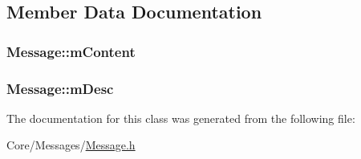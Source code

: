 \subsection{Member Data Documentation}
\subsubsection[{\texorpdfstring{m\+Content}{mContent}}]{ Message\+::m\+Content\hspace{0.3cm}{\ttfamily [private]}}\hypertarget{classMessage_a2186c08dfc88dd436d0df1018f5765e6}{}\label{classMessage_a2186c08dfc88dd436d0df1018f5765e6}
\subsubsection[{\texorpdfstring{m\+Desc}{mDesc}}]{ Message\+::m\+Desc\hspace{0.3cm}{\ttfamily [private]}}\hypertarget{classMessage_af468496867cb091479ca34266e77ffa5}{}\label{classMessage_af468496867cb091479ca34266e77ffa5}


The documentation for this class was generated from the following file\+:\begin{DoxyCompactItemize}
\item 
Core/\+Messages/\hyperlink{Message_8h}{Message.\+h}\end{DoxyCompactItemize}
